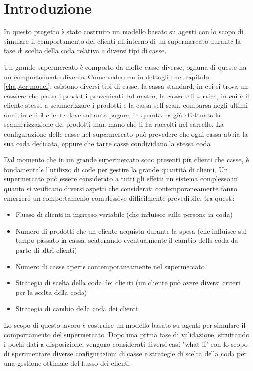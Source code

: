 \chapter{Introduzione}

In questo progetto è stato costruito un modello basato su agenti con lo scopo di simulare il comportamento dei clienti all'interno di un supermercato durante la fase di scelta della coda relativa a diversi tipi di casse.

Un grande supermercato è composto da molte casse diverse, ognuna di queste ha un comportamento diverso. Come vederemo in dettaglio nel capitolo \ref{chapter:model}, esistono diversi tipi di casse: la cassa standard, in cui si trova un cassiere che passa i prodotti provenienti dal nastro, la cassa self-service, in cui è il cliente stesso a scannerizzare i prodotti e la cassa self-scan, comparsa negli ultimi anni, in cui il cliente deve soltanto pagare, in quanto ha già effettuato la scannerizzazione dei prodotti man mano che li ha raccolti nel carrello. La configurazione delle casse nel supermercato può prevedere che ogni cassa abbia la sua coda dedicata, oppure che tante casse condividano la stessa coda.

Dal momento che in un grande supermercato sono presenti più clienti che casse, è fondamentale l'utilizzo di code per gestire la grande quantità di clienti.  Un supermercato può essere considerato a tutti gli effetti un sistema complesso in quanto si verificano diversi aspetti che considerati contemporaneamente fanno emergere un comportamento complessivo difficilmente prevedibile, tra questi:
\begin{itemize}
	\item Flusso di clienti in ingresso variabile (che influisce sulle persone in coda)
	\item Numero di prodotti che un cliente acquista durante la spesa (che influisce sul tempo passato in cassa, scatenando eventualmente il cambio della coda da parte di altri clienti)
	\item Numero di casse aperte contemporaneamente nel supermercato
	\item Strategia di scelta della coda dei clienti (un cliente può avere diversi criteri per la scelta della coda)
	\item Strategia di cambio della coda dei clienti
\end{itemize}


Lo scopo di questo lavoro è costruire un modello basato su agenti per simulare il comportamento del supermercato. Dopo una prima fase di validazione, sfruttando i pochi dati a disposizione, vengono considerati diversi casi "what-if" con lo scopo di sperimentare diverse configurazioni di casse e strategie di scelta della coda per una gestione ottimale del flusso dei clienti. 


